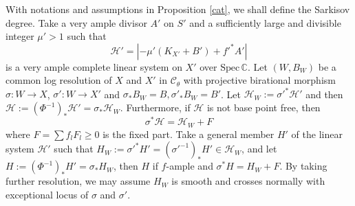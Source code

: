 \documentclass[11pt]{amsart}
\begin{document}
With notations and assumptions in Proposition \ref{cat},   we shall define the Sarkisov degree. Take a  very ample divisor $ A'  $ on $ S' $ and a sufficiently large and divisible integer $ \mu'>1 $ such that 
\[ \mathcal{H}'=|-\mu' (K_{X'}+B') +f'^*A'| \]
is a very ample complete linear system on $ X' $ over $ \mathrm{Spec}\,\mathbb{C} $. Let $ (W,B_W) $ be a common log resolution of $ X $ and $ X' $ in $ \mathcal{C}_\theta $ with projective birational morphism $ \sigma:W\to X$,   $\sigma':W\to X' $ and $\sigma_*B_W=B, \sigma'_*B_W=B' $. Let $\mathcal{H}_W:=\sigma'^*\mathcal{H}'$
and then  $\mathcal{H}:=(\Phi^{-1})_*\mathcal{H}'=\sigma_*\mathcal{H}_W$. Furthermore, if $ \mathcal{H} $ is not base point free, then
\[ \sigma^*\mathcal{H}=\mathcal{H}_W+F \]
where $ F=\sum f_lF_l\geqslant0 $ is the fixed part. Take a general member $ H' $ of the linear system $ \mathcal{H}' $ such that $ H_W:=\sigma'^*H'=(\sigma'^{-1})_*H'\in \mathcal{H}_W $, and let $ H:=(\Phi^{-1})_*H'=\sigma_*H_{W} $, then $H$ if $f$-ample and $ \sigma^*H=H_W+F $. By taking further resolution, we may assume $H_{W}$ is smooth and crosses normally with exceptional locus of $\sigma$ and $\sigma'$.

\end{document}
